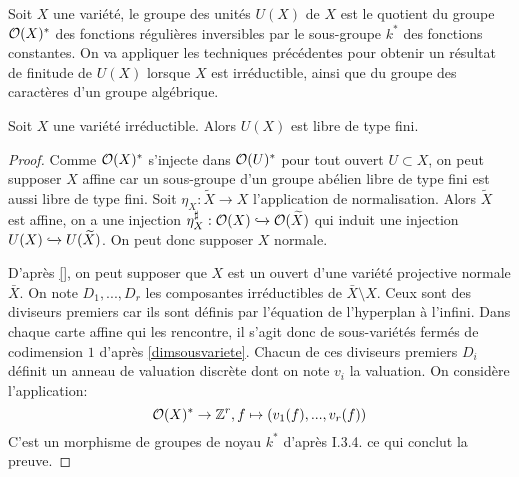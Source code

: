 Soit $X$ une variété, le groupe des unités $U(X)$ de $X$ est le quotient du groupe $\mathcal{O}(X)^*$ des fonctions régulières inversibles par le sous-groupe $k^*$ des fonctions constantes. On va appliquer les techniques précédentes pour obtenir un résultat de finitude de $U(X)$ lorsque $X$ est irréductible, ainsi que du groupe des caractères d'un groupe algébrique.

\begin{prop}
Soit $X$ une variété irréductible. Alors $U(X)$ est libre de type fini.
\end{prop}
\begin{proof}
Comme $\mathcal{O}(X)^*$ s'injecte dans $\mathcal{O}(U)^*$ pour tout ouvert $U\subset X$, on peut supposer $X$ affine car un sous-groupe d'un groupe abélien libre de type fini est aussi libre de type fini. Soit $\eta_X:\widetilde{X}\rightarrow X$ l'application de normalisation. Alors $\widetilde{X}$ est affine, on a une injection $\eta_X^\sharp:\mathcal{O}(X)\xhookrightarrow{}\mathcal{O}(\widetilde{X})$ qui induit une injection $U(X)\xhookrightarrow{}U(\widetilde{X})$. On peut donc supposer $X$ normale.

D'après \ref{}, on peut supposer que $X$ est un ouvert d'une variété projective normale $\bar{X}$. On note $D_1,...,D_r$ les composantes irréductibles de $\bar{X}\setminus X$. Ceux sont des diviseurs premiers car ils sont définis par l'équation de l'hyperplan à l'infini. Dans chaque carte affine qui les rencontre, il s'agit donc de sous-variétés fermés de codimension $1$ d'après \ref{dimsousvariete}. Chacun de ces diviseurs premiers $D_i$ définit un anneau de valuation discrète dont on note $v_i$ la valuation. On considère l'application:
$$\mathcal{O}(X)^*\rightarrow \mathbb{Z}^r, f\mapsto (v_1(f),...,v_r(f))$$
C'est un morphisme de groupes de noyau $k^*$ d'après \cite{Hartshorne} I.3.4. ce qui conclut la preuve.
\end{proof}

